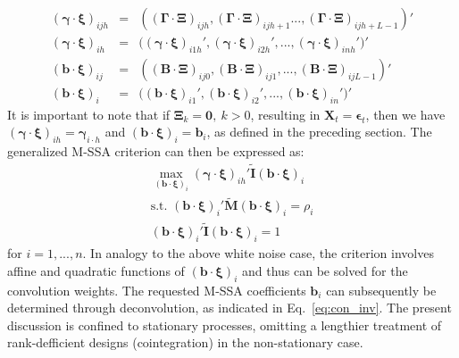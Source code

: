 \documentclass[11pt,a4paper]{article}
\begin{document}
\begin{eqnarray*}
(\boldsymbol{\gamma}\cdot\boldsymbol{\xi})_{ijh}&=&\left((\boldsymbol{\Gamma}\cdot\boldsymbol{\Xi})_{ijh},(\boldsymbol{\Gamma}\cdot\boldsymbol{\Xi})_{ ijh+1}...,(\boldsymbol{\Gamma}\cdot\boldsymbol{\Xi})_{ijh+L-1}\right)'\\
(\boldsymbol{\gamma}\cdot\boldsymbol{\xi})_{ih}&=&\Big((\boldsymbol{\gamma}\cdot\boldsymbol{\xi})_{i1h}',(\boldsymbol{\gamma}\cdot\boldsymbol{\xi})_{i2h}',...,(\boldsymbol{\gamma}\cdot\boldsymbol{\xi})_{inh}'\Big)'\\
(\mathbf{b}\cdot\boldsymbol{\xi})_{ij}&=&\left((\mathbf{B}\cdot\boldsymbol{\Xi})_{ ij0},(\mathbf{B}\cdot\boldsymbol{\Xi})_{ij1},...,(\mathbf{B}\cdot\boldsymbol{\Xi})_{ijL-1}\right)'\\
(\mathbf{b}\cdot\boldsymbol{\xi})_{i}&=&\Big((\mathbf{b}\cdot\boldsymbol{\xi})_{i1}',(\mathbf{b}\cdot\boldsymbol{\xi})_{i2}',...,(\mathbf{b}\cdot\boldsymbol{\xi})_{in}'\Big)'
\end{eqnarray*}
It is important to note that if $\boldsymbol{\Xi}_k=\mathbf{0},~k>0$, resulting in $\mathbf{X}_t=\boldsymbol{\epsilon}_t$, then we have $(\boldsymbol{\gamma}\cdot\boldsymbol{\xi})_{ih}=\boldsymbol{\gamma}_{i\cdot h}$ and $(\mathbf{b}\cdot\boldsymbol{\xi})_{i}=\mathbf{b}_i$, as defined in the preceding section. The generalized M-SSA criterion can then be expressed as: 
\begin{eqnarray}\label{eq:gen_stat_x}
\max_{(\mathbf{b}\cdot\boldsymbol{\xi})_i} (\boldsymbol{\gamma}\cdot\boldsymbol{\xi})_{ih}'\mathbf{\tilde{I}} (\mathbf{b}\cdot\boldsymbol{\xi})_i\\
\textrm{s.t.~}(\mathbf{b}\cdot\boldsymbol{\xi})_i'\mathbf{\tilde{M}}(\mathbf{b}\cdot\boldsymbol{\xi})_i=\rho_i\nonumber\\
(\mathbf{b}\cdot\boldsymbol{\xi})_i'\mathbf{\tilde{I}}(\mathbf{b}\cdot\boldsymbol{\xi})_i=1\nonumber
\end{eqnarray}
for $i=1,...,n$. In analogy to the above white noise case, the criterion involves affine and quadratic functions of $(\mathbf{b}\cdot\boldsymbol{\xi})_i$ and thus can be solved for the convolution weights. The requested M-SSA coefficients $\mathbf{b}_i$ can subsequently be determined through deconvolution, as indicated in Eq.~\eqref{eq:con_inv}. 
The present discussion is confined to stationary processes, omitting a lengthier treatment of rank-defficient designs (cointegration) in the non-stationary case.
\end{document}

